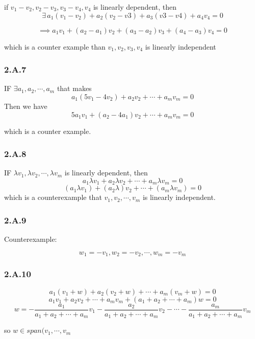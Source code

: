 if $v_{1}-v_{2}, v_{2} - v_{3}, v_{3}-v_{4}, v_{4}$ is linearly dependent, then 
\[\exists\, a_{1}(v_{1}-v_{2})+ a_{2}(v_{2} - v{3})+ a_{3}(v{3}-v{4})+ a_{4}v_{4} = 0 \]

\[\implies a_{1}v_{1} + (a_{2} - a_{1})v_{2} + (a_{3}-a_{2})v_{3} + (a_{4}-a_{3})v_{4} = 0\]

which is a counter example than $v_{1}, v_{2}, v_{3}, v_{4}$ is linearly independent

\subsubsection*{2.A.7}

IF $\exists a_{1}, a_{2}, \cdots,a_{m}$ that makes
\[a_{1}(5v_{1}-4v_{2}) + a_{2}v_{2}+\cdots + a_{m}v_{m} = 0\]
Then we have
\[5a_{1}v_{1} + (a_{2}-4a_{1})v_{2}+\cdots + a_{m}v_{m} = 0\]

which is a counter example.

\subsubsection*{2.A.8}

IF $\lambda v_{1}, \lambda v_{2}, \cdots, \lambda v_{m}$ is linearly dependent, then 
\[a_{1}\lambda v_{1} + a_{2}\lambda v_{2} + \cdots + a_{m}\lambda v_{m} = 0\]
\[(a_{1}\lambda v_{1}) + (a_{2}\lambda) v_{2} + \cdots + (a_{m}\lambda v_{m}) = 0\]
which is a counterexample that $v_{1}, v_{2}, \cdots, v_{m}$ is linearly independent.

\subsubsection*{2.A.9}

Counterexample:

\[w_{1} = -v_{1}, w_{2} = -v_{2},\cdots, w_{m} = -v_{m}\]

\subsubsection*{2.A.10}

\[a_{1}(v_{1}+w) + a_{2}(v_{2} + w)+\cdots + a_{m}(v_{m} + w) = 0\]
\[a_{1}v_{1} + a_{2}v_{2} + \cdots +a_{m}v_{m} + (a_{1}+a_{2}+\cdots +a_{m})w = 0\]
\[w=-\frac{a_{1}}{a_{1}+a_{2}+\cdots +a_{m}}v_{1} - \frac{a_{2}}{a_{1}+a_{2}+\cdots +a_{m}}v_{2} - \cdots - \frac{a_{m}}{a_{1}+a_{2}+\cdots +a_{m}}v_{m} \]

so $w\in span(v_{1},\cdots ,v_{m}$

